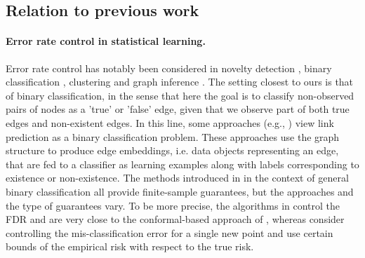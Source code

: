 \documentclass[a4paper, 11pt]{article}
\theoremstyle{remark}
\begin{document}

\subsection{Relation to previous work}

\paragraph{Error rate control in statistical learning.}
Error rate control has notably been considered in novelty detection \citep{bates2023testing, yang2021bonus, marandon22b, liang2022integrative}, binary classification \citep{geifman17, angelopoulos2021learn, rava2021burden, jin2022selection}, clustering \citep{marandon22a} and graph inference \citep{rebafka22}. 
The setting closest to ours is that of binary classification, 
in the sense that here
the goal is to classify non-observed pairs of nodes as a 'true' or 'false' edge, given that we observe part of both true edges and non-existent edges.
In this line, some %
approaches (e.g., \citealp{zhang2018link}) view link prediction as a binary classification problem. These approaches use the graph structure to produce edge embeddings, i.e. data objects representing an edge, that are fed to a classifier as learning examples along with labels corresponding to existence or non-existence. 
The methods introduced in \cite{geifman17, angelopoulos2021learn, rava2021burden, jin2022selection} in the context of general binary classification all provide finite-sample guarantees, but the approaches and the type of guarantees vary. To be more precise, the algorithms in \cite{rava2021burden, jin2022selection} control the FDR and are very close to the conformal-based approach of \cite{bates2023testing}, whereas \cite{geifman17, angelopoulos2021learn} consider controlling the mis-classification error for a single new point and use certain bounds of the empirical risk with respect to the true risk. 
\end{document}
